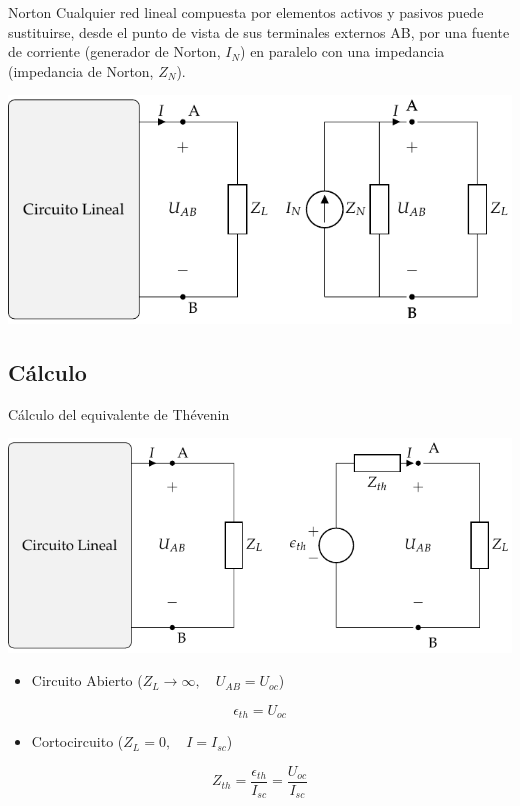 \documentclass[aspectratio=169, usenames,svgnames,dvipsnames]{beamer}
\begin{document}
\begin{frame}[label={sec:org40e7393}]{Norton}
Cualquier \alert{red lineal} compuesta por elementos activos y pasivos puede sustituirse, desde el punto de vista de sus terminales externos AB, por una \alert{fuente de corriente} (generador de Norton, \(I_N\)) en \alert{paralelo} con una impedancia (impedancia de Norton, \(Z_N\)).

\begin{center}
\includegraphics[height=0.6\textheight]{../figs/EquivalenteNorton.pdf}
\end{center}
\end{frame}

\subsection{Cálculo}
\label{sec:org41df041}
\begin{frame}[label={sec:org9d7d980}]{Cálculo del equivalente de Thévenin}
\begin{center}
\includegraphics[height=0.38\textheight]{../figs/EquivalenteThevenin.pdf}
\end{center}

\begin{itemize}
\item Circuito Abierto (\(Z_L \to \infty, \quad U_{AB} = U_{oc}\))
\end{itemize}
\[
\boxed{\epsilon_{th} = U_{oc}}
\]
\begin{itemize}
\item Cortocircuito (\(Z_L = 0, \quad I = I_{sc}\))
\end{itemize}
\[
\boxed{Z_{th} = \frac{\epsilon_{th}}{I_{sc}} = \frac{U_{oc}}{I_{sc}}}
\]
\end{frame}
\end{document}
